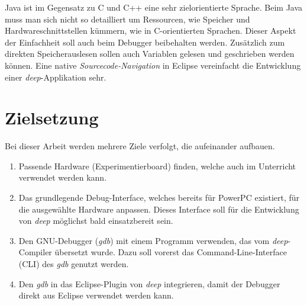 Java ist im Gegensatz zu C und C++ eine sehr zielorientierte Sprache.
Beim Java muss man sich nicht so detailliert um Ressourcen, wie Speicher und Hardwareschnittstellen kümmern, wie in C-orientierten Sprachen.
Dieser Aspekt der Einfachheit soll auch beim Debugger beibehalten werden.
Zusätzlich zum direkten Speicherauslesen sollen auch Variablen gelesen und geschrieben werden können.
Eine native \textit{Sourcecode-Navigation} in Eclipse vereinfacht die Entwicklung einer \textit{deep}-Applikation sehr.



\section{Zielsetzung}
Bei dieser Arbeit werden mehrere Ziele verfolgt, die aufeinander aufbauen.


\begin{enumerate}
\item Passende Hardware (Experimentierboard) finden, welche auch im Unterricht verwendet werden kann.
\item Das grundlegende Debug-Interface, welches bereits für PowerPC existiert, für die ausgewählte Hardware anpassen. Dieses Interface soll für die Entwicklung von \textit{deep} möglichst bald einsatzbereit sein.
\item Den GNU-Debugger (\textit{gdb}) mit einem Programm verwenden, das vom \textit{deep}-Compiler übersetzt wurde. Dazu soll vorerst das Command-Line-Interface (CLI) des \textit{gdb} genutzt werden.
\item Den \textit{gdb} in das Eclipse-Plugin von \textit{deep} integrieren, damit der Debugger direkt aus Eclipse verwendet werden kann.
\end{enumerate}








